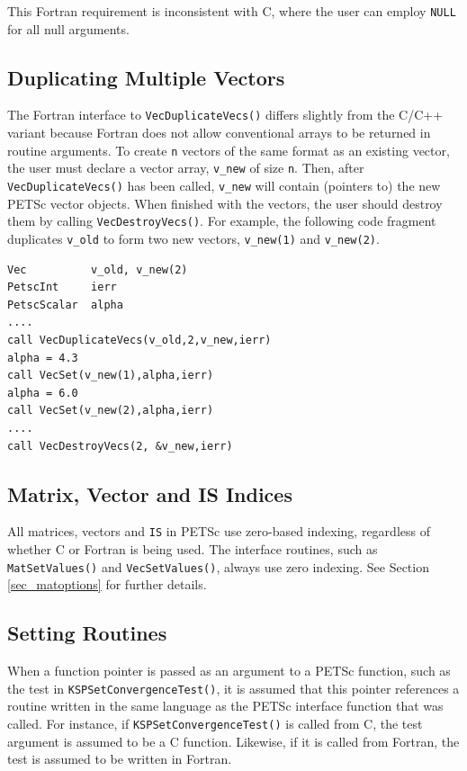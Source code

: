 {This Fortran requirement is inconsistent with C, where the
user can employ \lstinline{NULL} for all null arguments.

\subsection{Duplicating Multiple Vectors}
\label{sec_fortvecd}

The Fortran interface to \lstinline{VecDuplicateVecs()} differs slightly
from the C/C++ variant because Fortran does not allow conventional arrays to be
returned in routine arguments.  To create \lstinline{n} vectors of the same
format as an existing vector, the user must declare a vector array,
\lstinline{v_new} of size \lstinline{n}.  Then, after \lstinline{VecDuplicateVecs()} has
been called, \lstinline{v_new} will contain (pointers to) the new PETSc
vector objects.  When finished with the vectors, the user should
destroy them by calling \lstinline{VecDestroyVecs()}.
For example, the following code fragment
duplicates \lstinline{v_old} to form two new vectors, \lstinline{v_new(1)} and \lstinline{v_new(2)}.
\begin{lstlisting}
Vec          v_old, v_new(2)
PetscInt     ierr
PetscScalar  alpha
....
call VecDuplicateVecs(v_old,2,v_new,ierr)
alpha = 4.3
call VecSet(v_new(1),alpha,ierr)
alpha = 6.0
call VecSet(v_new(2),alpha,ierr)
....
call VecDestroyVecs(2, &v_new,ierr)
\end{lstlisting}

\subsection{Matrix, Vector and IS Indices}

All matrices, vectors and \lstinline{IS} in PETSc use zero-based indexing, regardless
of whether C or Fortran is being used.  The interface routines, such
as \lstinline{MatSetValues()} and \lstinline{VecSetValues()}, always use zero
indexing.  See Section \ref{sec_matoptions} for further details.

\subsection{Setting Routines}

When a function pointer is passed as an argument to a PETSc function, such as
the test in \lstinline{KSPSetConvergenceTest()}, it is assumed that this pointer references
a routine written in the same language as the PETSc interface function that was
called. For instance, if \lstinline{KSPSetConvergenceTest()} is called from C, the test
argument is assumed to be a C function. Likewise, if it is called from Fortran,
the test is assumed to be written in Fortran.

}
